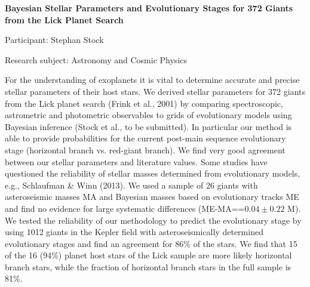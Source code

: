 \begin{minipage}[t]{1.0\textwidth}

\begin{center}

{{\large\bfseries Bayesian Stellar Parameters and Evolutionary Stages for 372 Giants from the Lick Planet Search}\par}

\end{center}

{\noindent Participant: Stephan Stock\par} 

{\noindent Research subject: Astronomy and Cosmic Physics\par}\medskip

\noindent For the understanding of exoplanets it is vital to determine accurate and precise stellar parameters of their host stars. We derived stellar parameters for 372 giants from the Lick planet search (Frink et al., 2001) by comparing spectroscopic, astrometric and photometric observables to grids of evolutionary models using Bayesian inference (Stock et al., to be submitted). In particular our method is able to provide probabilities for the current post-main sequence evolutionary stage (horizontal branch vs. red-giant branch). We find very good agreement between our stellar parameters and literature values. Some studies have questioned the reliability of stellar masses determined from evolutionary models, e.g., Schlaufman \& Winn (2013). We used a sample of 26 giants with asteroseismic masses MA and Bayesian masses based on evolutionary tracks  ME and find no evidence for large systematic differences (ME-MA==$0.04\pm0.22$ M). We tested the reliability of our methodology to predict the evolutionary stage by using 1012 giants in the Kepler field with asteroseismically determined evolutionary stages and find an agreement for 86\% of the stars. We find that 15 of the 16 (94\%)  planet host stars of the Lick sample are more likely horizontal branch stars, while the fraction of horizontal branch stars in the full sample is 81\%.\par\end{minipage}

\hfill 


